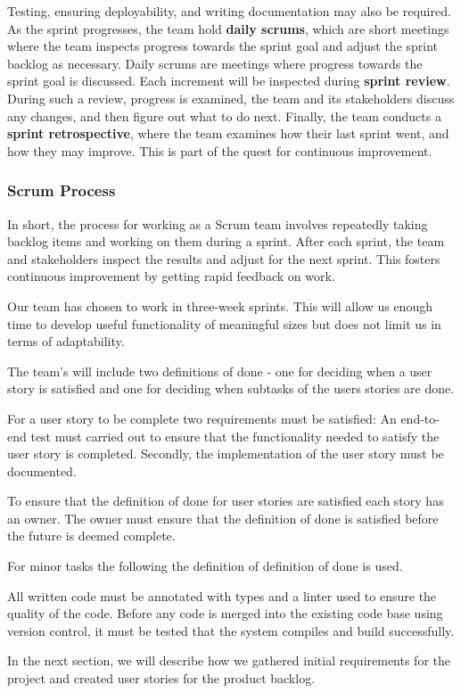 Testing, ensuring deployability, and writing documentation may also be required.
As the sprint progresses, the team hold \textbf{daily scrums}, which are short meetings where the team inspects progress towards the sprint goal and adjust the sprint backlog as necessary.
Daily scrums are meetings where progress towards the sprint goal is discussed.
Each increment will be inspected during \textbf{sprint review}.
During such a review, progress is examined, the team and its stakeholders discuss any changes, and then figure out what to do next.
Finally, the team conducts a \textbf{sprint retrospective}, where the team examines how their last sprint went, and how they may improve.
This is part of the quest for continuous improvement.\cite{sutherlandScrumArtDoing2014}

\subsubsection*{Scrum Process}
In short, the process for working as a Scrum team involves repeatedly taking backlog items and working on them during a sprint.
After each sprint, the team and stakeholders inspect the results and adjust for the next sprint.
This fosters continuous improvement by getting rapid feedback on work.

Our team has chosen to work in three-week sprints.
This will allow us enough time to develop useful functionality of meaningful sizes but does not limit us in terms of adaptability.

The team's will include two definitions of done - one for deciding when a user story is satisfied and one for deciding when subtasks of the users stories are done.
\begin{dod}
    For a user story to be complete two requirements must be satisfied: An end-to-end test must carried out to ensure that the functionality needed to satisfy the user story is completed. Secondly, the implementation of the user story must be documented. 
\end{dod}
To ensure that the definition of done for user stories are satisfied each story has an owner. 
The owner must ensure that the definition of done is satisfied before the future is deemed complete.

For minor tasks the following the definition of definition of done is used. 
\begin{dod}
    All written code must be annotated with types and a linter used to ensure the quality of the code.
    Before any code is merged into the existing code base using version control, it must be tested that the system compiles and build successfully.  
\end{dod}

In the next section, we will describe how we gathered initial requirements for the project and created user stories for the product backlog.